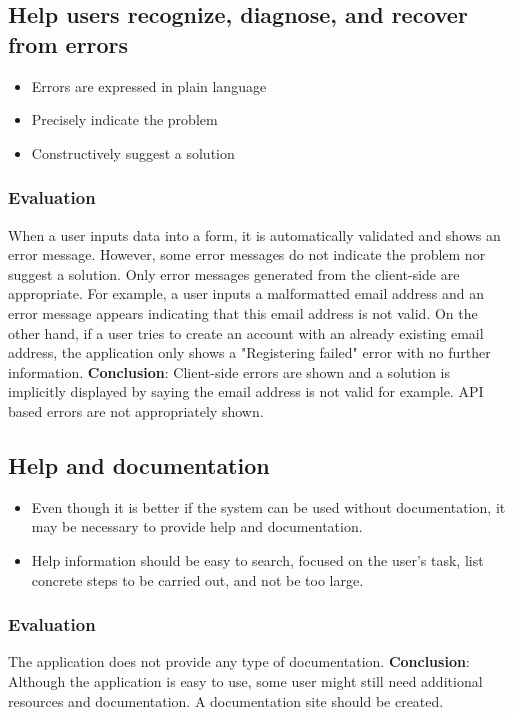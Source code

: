 \subsection{Help users recognize, diagnose, and recover from errors}

\begin{itemize}
    \item Errors are expressed in plain language
    \item Precisely indicate the problem
    \item Constructively suggest a solution 
\end{itemize}

\subsubsection{Evaluation}
When a user inputs data into a form, it is automatically validated and shows an error message. However, some error messages do not indicate the problem nor suggest a solution. Only error messages generated from the client-side are appropriate. For example, a user inputs a malformatted email address and an error message appears indicating that this email address is not valid. On the other hand, if a user tries to create an account with an already existing email address, the application only shows a "Registering failed" error with no further information. \textbf{Conclusion}: Client-side errors are shown and a solution is implicitly displayed by saying the email address is not valid for example. API based errors are not appropriately shown.  

\subsection{Help and documentation}

\begin{itemize}
    \item Even though it is better if the system can be used without documentation, it may be necessary to provide help and documentation. 
    \item Help information should be easy to search, focused on the user's task, list concrete steps to be carried out, and not be too large.
\end{itemize}

\subsubsection{Evaluation}
The application does not provide any type of documentation. \textbf{Conclusion}: Although the application is easy to use, some user might still need additional resources and documentation. A documentation site should be created.


